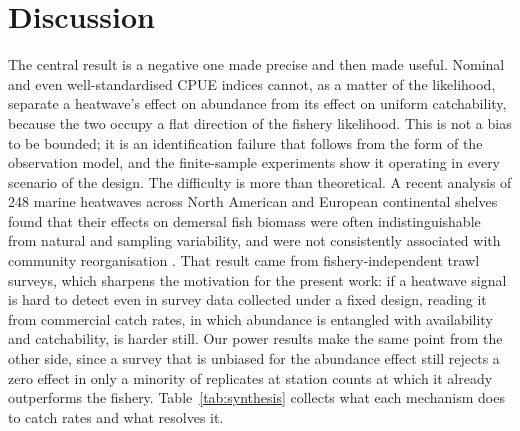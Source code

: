 \documentclass[11pt,a4paper]{article}
\begin{document}
\section{Discussion}

The central result is a negative one made precise and then made useful. Nominal and even well-standardised CPUE indices cannot, as a matter of the likelihood, separate a heatwave's effect on abundance from its effect on uniform catchability, because the two occupy a flat direction of the fishery likelihood. This is not a bias to be bounded; it is an identification failure that follows from the form of the observation model, and the finite-sample experiments show it operating in every scenario of the design. The difficulty is more than theoretical. A recent analysis of 248 marine heatwaves across North American and European continental shelves found that their effects on demersal fish biomass were often indistinguishable from natural and sampling variability, and were not consistently associated with community reorganisation \citep{fredston2023}. That result came from fishery-independent trawl surveys, which sharpens the motivation for the present work: if a heatwave signal is hard to detect even in survey data collected under a fixed design, reading it from commercial catch rates, in which abundance is entangled with availability and catchability, is harder still. Our power results make the same point from the other side, since a survey that is unbiased for the abundance effect still rejects a zero effect in only a minority of replicates at station counts at which it already outperforms the fishery. Table~\ref{tab:synthesis} collects what each mechanism does to catch rates and what resolves it.
\end{document}
